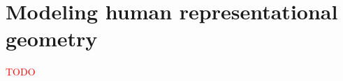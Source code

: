 \chapter{Modeling human representational geometry}
\label{chap:modeling_human}

\textcolor{red}{TODO}
